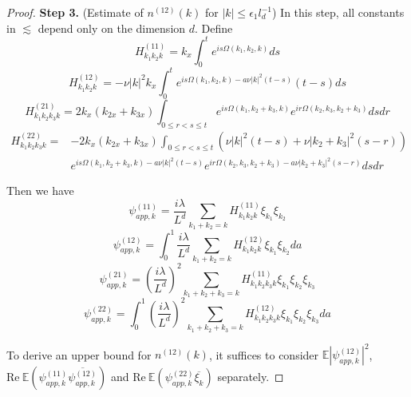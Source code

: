 \begin{proof}
\textbf{Step 3.} (Estimate of $n^{(12)}(k)$ for $|k|\le \epsilon_1 l_{d}^{-1}$) In this step, all constants in $\lesssim$ depend only on the dimension $d$. Define 
\begin{equation}\label{eq.H(11)}
    H^{(11)}_{k_1k_2k}=k_{x} \int^{t}_0e^{i s\Omega(k_1,k_2,k)} ds
\end{equation}
\begin{equation}\label{eq.H(12)}
    H^{(12)}_{k_1k_2k}=-\nu|k|^2k_{x} \int^{t}_0e^{i s\Omega(k_1,k_2,k)- a\nu|k|^2(t-s)} (t-s)ds
\end{equation}
\begin{equation}\label{eq.H(21)}
    H^{(21)}_{k_1k_2k_3k}=2k_{x}(k_{2x}+k_{3x})\int_{0\le r<s\le t}e^{i s\Omega(k_1,k_2+k_3,k)} e^{i r\Omega(k_2,k_3,k_2+k_3)} dsdr
\end{equation}
\begin{equation}\label{eq.H(22)}
\begin{split}
    H^{(22)}_{k_1k_2k_3k}=&-2k_{x}(k_{2x}+k_{3x})\int_{0\le r<s\le t}(\nu|k|^2(t-s)+\nu|k_2+k_3|^2(s-r))
    \\
    & e^{i s\Omega(k_1,k_2+k_3,k)- a\nu|k|^2(t-s)} e^{i r\Omega(k_2,k_3,k_2+k_3)- a\nu|k_2+k_3|^2(s-r)} dsdr
\end{split}
\end{equation}

Then we have
\begin{equation}\label{eq.psi(11)app}
    \psi^{(11)}_{app,k}=\frac{i\lambda}{L^{d}} \sum\limits_{k_1+k_2=k} H^{(11)}_{k_1k_2k}\xi_{k_1} \xi_{k_2} 
\end{equation}
\begin{equation}\label{eq.psi(12)app}
    \psi^{(12)}_{app,k}=\int^1_{0}\frac{i\lambda}{L^{d}} \sum\limits_{k_1+k_2=k} H^{(12)}_{k_1k_2k}\xi_{k_1} \xi_{k_2} da 
\end{equation}
\begin{equation}\label{eq.psi(21)app}
    \psi^{(21)}_{app,k}=\left(\frac{i\lambda}{L^{d}}\right)^2 \sum\limits_{k_1+k_2+k_3=k} H^{(11)}_{k_1k_2k_3k}\xi_{k_1} \xi_{k_2}\xi_{k_3} 
\end{equation}
\begin{equation}\label{eq.psi(22)app}
    \psi^{(22)}_{app,k}=\int^1_{0}\left(\frac{i\lambda}{L^{d}}\right)^2 \sum\limits_{k_1+k_2+k_3=k} H^{(12)}_{k_1k_2k_3k}\xi_{k_1} \xi_{k_2}\xi_{k_3} da 
\end{equation}

To derive an upper bound for $n^{(12)}(k)$, it suffices to consider $\mathbb E \left|\psi^{(12)}_{app,k}\right|^2$, $\text{Re}\ \mathbb E \left(\psi^{(11)}_{app,k}\overline{\psi^{(12)}_{app,k}}\right)$ and $\text{Re}\  \mathbb E \left(\psi^{(22)}_{app,k}\overline{\xi_k}\right)$ separately.


\end{proof}
